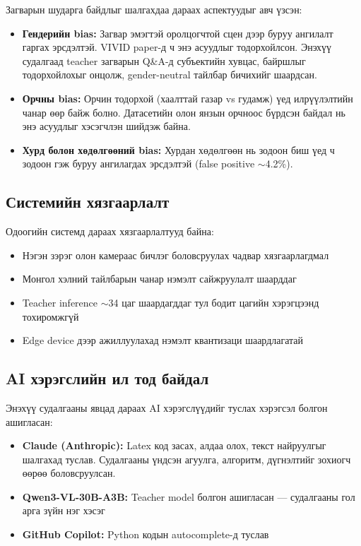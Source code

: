 Загварын шударга байдлыг шалгахдаа дараах аспектуудыг авч үзсэн:

\begin{itemize}
    \item \textbf{Гендерийн bias:} Загвар эмэгтэй оролцогчтой сцен дээр буруу ангилалт гаргах эрсдэлтэй. VIVID \cite{Gonzalez2025} paper-д ч энэ асуудлыг тодорхойлсон. Энэхүү судалгаад teacher загварын Q\&A-д субъектийн хувцас, байршлыг тодорхойлохыг онцолж, gender-neutral тайлбар бичихийг шаардсан.
    \item \textbf{Орчны bias:} Орчин тодорхой (хаалттай газар vs гудамж) үед илрүүлэлтийн чанар өөр байж болно. Датасетийн олон янзын орчноос бүрдсэн байдал нь энэ асуудлыг хэсэгчлэн шийдэж байна.
    \item \textbf{Хурд болон хөдөлгөөний bias:} Хурдан хөдөлгөөн нь зодоон биш үед ч зодоон гэж буруу ангилагдах эрсдэлтэй (false positive $\sim$4.2\%).
\end{itemize}

\subsection{Системийн хязгаарлалт}

Одоогийн системд дараах хязгаарлалтууд байна:

\begin{itemize}
    \item Нэгэн зэрэг олон камераас бичлэг боловсруулах чадвар хязгаарлагдмал
    \item Монгол хэлний тайлбарын чанар нэмэлт сайжруулалт шаарддаг
    \item Teacher inference $\sim$34 цаг шаардагддаг тул бодит цагийн хэрэгцээнд тохиромжгүй
    \item Edge device дээр ажиллуулахад нэмэлт квантизаци шаардлагатай
\end{itemize}

\subsection{AI хэрэгслийн ил тод байдал}

Энэхүү судалгааны явцад дараах AI хэрэгслүүдийг туслах хэрэгсэл болгон ашигласан:

\begin{itemize}
    \item \textbf{Claude (Anthropic):} Latex код засах, алдаа олох, текст найруулгыг шалгахад туслав. Судалгааны үндсэн агуулга, алгоритм, дүгнэлтийг зохиогч өөрөө боловсруулсан.
    \item \textbf{Qwen3-VL-30B-A3B:} Teacher model болгон ашигласан --- судалгааны гол арга зүйн нэг хэсэг
    \item \textbf{GitHub Copilot:} Python кодын autocomplete-д туслав
\end{itemize}

